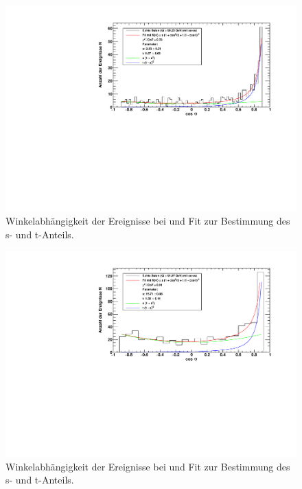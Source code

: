 \begin{figure}[H]
    \begin{center}
        \includegraphics[width=\textwidth]{../img/s_t_fit_90-23.pdf}
        \caption{Winkelabhängigkeit der Ereignisse bei  und Fit zur Bestimmung des s- und t-Anteils.}
        \label{img:st:9023}
    \end{center}
\end{figure}

\begin{figure}[H]
    \begin{center}
        \includegraphics[width=\textwidth]{../img/s_t_fit_91-97.pdf}
        \caption{Winkelabhängigkeit der Ereignisse bei  und Fit zur Bestimmung des s- und t-Anteils.}
        \label{img:st:9197}
    \end{center}
\end{figure}

